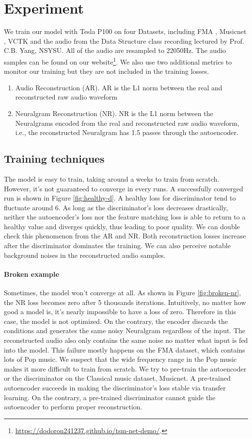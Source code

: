\documentclass[12pt]{article}
\begin{document}
\section{Experiment}
We train our model with Tesla P100 on four Datasets, including FMA \cite{kir16}, Musicnet \cite{joh18}, VCTK \cite{yam19} and the audio from the Data Structure class recording \cite{chu21} lectured by Prof. C.B. Yang, NSYSU. All of the audio are resampled to 22050Hz. The audio samples can be found on our website\footnote{\url{https://dodoron241237.github.io/tsm-net-demo/}.}. We also use two additional metrics to monitor our training but they are not included in the training losses.
\begin{enumerate}
  \item{Audio Reconstruction (AR). AR is the L1 norm between the real and reconstructed raw audio waveform}
  \item{Neuralgram Reconstruction (NR). NR is the L1 norm between the Neuralgrams encoded from the real and reconstructed raw audio waveform, i.e., the reconstructed Neuralgram has 1.5 passes through the autoencoder.}
\end{enumerate}

\subsection{Training techniques}
The model is easy to train, taking around a weeks to train from scratch. However, it's not guaranteed to converge in every runs. A successfully converged run is shown in Figure \ref{fig:healthy-d}. A healthy loss for discriminator tend to fluctuate around 6. As long as the discriminator's loss decreases drastically, neither the autoencoder's loss nor the feature matching loss is able to return to a healthy value and diverges quickly, thus leading to poor quality. We can double check this phenomenon from the AR and NR. Both reconstruction losses increase after the discriminator dominates the training. We can also perceive notable background noises in the reconstructed audio samples.

\paragraph{Broken example} Sometimes, the model won't converge at all. As shown in Figure \ref{fig:broken-nr}, the NR loss becomes zero after 5 thousands iterations. Intuitively, no matter how good a model is, it's nearly impossible to have a loss of zero. Therefore in this case, the model is not optimized. On the contrary, the encoder discards the conditions and generates the same noisy Neuralgram regardless of the input. The reconstructed audio also only contains the same noise no matter what input is fed into the model. This failure mostly happens on the FMA dataset, which contains lots of Pop music. We suspect that the wide frequency range in the Pop music makes it more difficult to train from scratch. We try to pre-train the autoencoder or the discriminator on the Classical music dataset, Musicnet. A pre-trained autoencoder succeeds in making the discriminator's loss stable via transfer learning. On the contrary, a pre-trained discriminator cannot guide the autoencoder to perform proper reconstruction.
\end{document}

